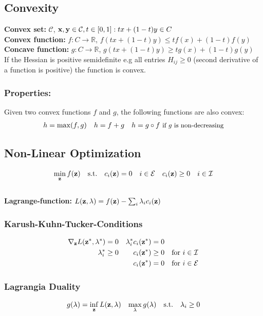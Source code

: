 \begin{mdframed}[style=eqbox]
\subsection{Convexity}
\textbf{Convex set:} $\mathcal C$, $\mathbf{x}, \mathbf{y} \in \mathcal C, t \in [0,1]: t x + (1-t)y \in C$\\
\textbf{Convex function:} $f: C \to \mathbb R$, $f(t x + (1-t)y) \leq tf(x) + (1-t)f(y)$\\
\textbf{Concave function:} $g: C \to \mathbb R$, $g(t x + (1-t)y) \geq tg(x) + (1-t)g(y)$\\
If the Hessian is positive semidefinite e.g all entries $H_{ij} \geq 0$ (second derivative of a function is positive) the function is convex.
\subsubsection{Properties:}
Given two convex functions $f$ and $g$, the following functions are also convex:
\vspace*{-8pt}\begin{align*}
  h = \max (f, g) && h = f + g && h = g \circ f \text{ \small{if $g$ is non-decreasing}}
\end{align*}
\end{mdframed}
%
\begin{mdframed}[style=eqbox]
\subsection{Non-Linear Optimization}
\vspace*{-6pt}\begin{align*}
  \min_{\mathbf{z}} f(\mathbf{z}) &&\text{s.t.} \quad c_i(\mathbf{z}) = 0 \quad i \in \mathcal E && c_i(\mathbf{z}) \geq 0 \quad i \in \mathcal I
\end{align*}\vspace*{-14pt}\\
\textbf{Lagrange-function:} $L(\mathbf{z}, \mathbf{\lambda}) = f(\mathbf{z}) - \sum_i \lambda_i c_i(\mathbf{z})$
\subsubsection{Karush-Kuhn-Tucker-Conditions}
\vspace*{-8pt}\begin{align*}
  \nabla_{\mathbf{z}} L(\mathbf{z}^*, \mathbf{\lambda}^*) = 0 && \lambda_i^* c_i(\mathbf{z}^*) = 0\\
  \lambda_i^* \geq 0 && c_i(\mathbf{z}^*) \geq 0 && \text{for } i \in \mathcal I\\
  && c_i(\mathbf{z}^*) = 0 && \text{for } i \in \mathcal E
\end{align*}
\subsubsection{Lagrangia Duality}
\vspace*{-6pt}\begin{align*}
  g(\mathbf{\lambda}) = \inf_{\mathbf{z}} L(\mathbf{z}, \mathbf{\lambda}) && \max_{\mathbf{\lambda}} g(\mathbf{\lambda}) \quad \text{s.t.} \quad \lambda_i \geq 0
\end{align*}
\end{mdframed}